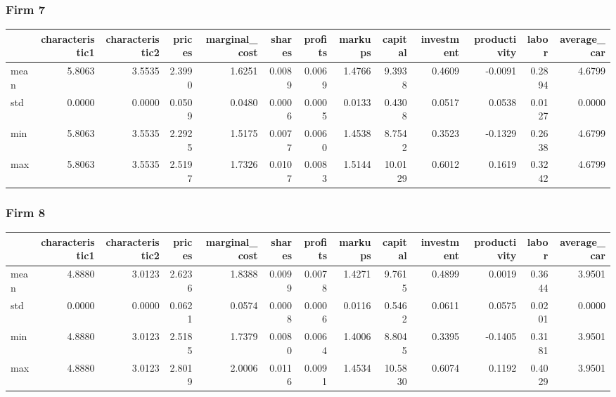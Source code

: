  \subsubsection*{Firm 7}
\begin{tabular}{lrrrrrrrrrrrr}
\toprule
{} &  characteristic1 &  characteristic2 &  prices &  marginal\_cost &  shares &  profits &  markups &  capital &  investment &  productivity &  labor &  average\_car \\
\midrule
mean &           5.8063 &           3.5535 &  2.3990 &         1.6251 &  0.0089 &   0.0069 &   1.4766 &   9.3938 &      0.4609 &       -0.0091 & 0.2894 &       4.6799 \\
std  &           0.0000 &           0.0000 &  0.0509 &         0.0480 &  0.0006 &   0.0005 &   0.0133 &   0.4308 &      0.0517 &        0.0538 & 0.0127 &       0.0000 \\
min  &           5.8063 &           3.5535 &  2.2925 &         1.5175 &  0.0077 &   0.0060 &   1.4538 &   8.7542 &      0.3523 &       -0.1329 & 0.2638 &       4.6799 \\
max  &           5.8063 &           3.5535 &  2.5197 &         1.7326 &  0.0107 &   0.0083 &   1.5144 &  10.0129 &      0.6012 &        0.1619 & 0.3242 &       4.6799 \\
\bottomrule
\end{tabular}


 \subsubsection*{Firm 8}
\begin{tabular}{lrrrrrrrrrrrr}
\toprule
{} &  characteristic1 &  characteristic2 &  prices &  marginal\_cost &  shares &  profits &  markups &  capital &  investment &  productivity &  labor &  average\_car \\
\midrule
mean &           4.8880 &           3.0123 &  2.6236 &         1.8388 &  0.0099 &   0.0078 &   1.4271 &   9.7615 &      0.4899 &        0.0019 & 0.3644 &       3.9501 \\
std  &           0.0000 &           0.0000 &  0.0621 &         0.0574 &  0.0008 &   0.0006 &   0.0116 &   0.5462 &      0.0611 &        0.0575 & 0.0201 &       0.0000 \\
min  &           4.8880 &           3.0123 &  2.5185 &         1.7379 &  0.0080 &   0.0064 &   1.4006 &   8.8045 &      0.3395 &       -0.1405 & 0.3181 &       3.9501 \\
max  &           4.8880 &           3.0123 &  2.8019 &         2.0006 &  0.0116 &   0.0091 &   1.4534 &  10.5830 &      0.6074 &        0.1192 & 0.4029 &       3.9501 \\
\bottomrule
\end{tabular}


